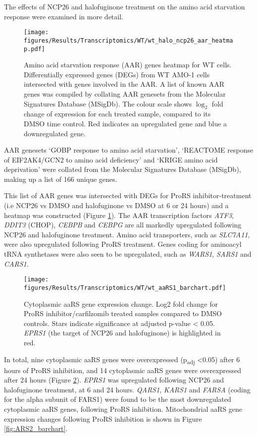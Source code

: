 The effects of NCP26 and halofuginone treatment on the amino acid starvation response were examined in more detail.
\begin{figure}[p]
\centering
\texttt{[image: figures/Results/Transcriptomics/WT/wt\_halo\_ncp26\_aar\_heatmap.pdf]}
\caption[Amino acid starvation response genes heatmap WT cells]{Amino acid starvation response (AAR) genes heatmap for WT cells.
Differentially expressed genes (DEGs) from WT AMO-1 cells intersected with genes involved in the AAR.
A list of known AAR genes was compiled by collating AAR genesets from the Molecular Signatures Database (MSigDb).
The colour scale shows $\log_{2}$ fold change of expression for each treated sample, compared to its DMSO time control.
Red indicates an upregulated gene and blue a downregulated gene.
}
\label{fig:wt_aar_heatmap}
\end{figure}
%
AAR genesets `GOBP response to amino acid starvation', `REACTOME response of EIF2AK4/GCN2 to amino acid deficiency' and `KRIGE amino acid deprivation' were collated from the Molecular Signatures Database (MSigDb), making up a list of 166 unique genes.

This list of AAR genes was intersected with DEGs for ProRS inhibitor-treatment (i.e NCP26 vs DMSO and halofuginone vs DMSO at 6 or 24 hours) and a heatmap was constructed (Figure \ref{fig:wt_aar_heatmap}).
The AAR transcription factors \textit{ATF3}, \textit{DDIT3} (CHOP), \textit{CEBPB} and \textit{CEBPG} are all markedly upregulated following NCP26 and halofuginone treatment.
Amino acid transporters, such as \textit{SLC7A11}, were also upregulated following ProRS treatment.
Genes coding for aminoacyl tRNA synthetases were also seen to be upregulated, such as \textit{WARS1}, \textit{SARS1} and \textit{CARS1}.
\begin{figure}[htb]
\centering
\texttt{[image: figures/Results/Transcriptomics/WT/wt\_aaRS1\_barchart.pdf]}
\caption[Cytoplasmic aaRS gene expression change- WT cells]{Cytoplasmic aaRS gene expression change.
Log2 fold change for ProRS inhibitor/carfilzomib treated samples compared to DMSO controls.
Stars indicate significance at adjusted p-value < 0.05.
\textit{EPRS1} (the target of NCP26 and halofuginone) is highlighted in red.
}
\label{fig:wt_ARS1}
\end{figure}
In total, nine cytoplasmic aaRS genes were overexpressed (p\textsubscript{adj} <0.05) after 6 hours of ProRS inhibition, and 14 cytoplasmic aaRS genes were overexpressed after 24 hours (Figure \ref{fig:wt_ARS1}).
\textit{EPRS1} was upregulated following NCP26 and halofuginone treatment, at 6 and 24 hours.
\textit{QARS1}, \textit{KARS1} and \textit{FARSA} (coding for the alpha subunit of FARS1) were found to be the most downregulated cytoplasmic aaRS genes, following ProRS inhibition.
Mitochondrial aaRS gene expression changes following ProRS inhibition is shown in Figure \ref{fig:ARS2_barchart}.

